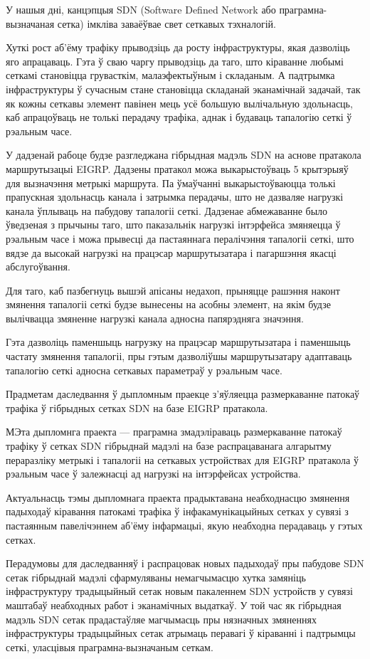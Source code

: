 \sectionWithoutNumber{\prefacename}

У нашыя дні, канцэпцыя SDN (Software Defined Network або праграмна-вызначаная сетка)
імкліва заваёўвае свет сеткавых тэхналогій.

Хуткі рост аб'ёму трафіку прыводзіць да росту інфраструктуры, якая
дазволіць яго апрацаваць. Гэта ў сваю чаргу прыводзіць да таго, што кіраванне
любымі сеткамі становіцца грувасткім, малаэфектыўным і складаным.
А падтрымка інфраструктуры ў сучасным стане становіцца складанай эканамічнай задачай,
так як кожны сеткавы элемент павінен мець усё большую вылічальную здольнасць, каб
апрацоўваць не толькі перадачу трафіка, аднак і будаваць тапалогію сеткі ў рэальным часе.

У дадзенай рабоце будзе разгледжана гібрыдная мадэль
SDN на аснове пратакола маршрутызацыі EIGRP.
Дадзены пратакол можа выкарыстоўваць 5 крытэрыяў для вызначэння метрыкі маршрута.
Па ўмаўчанні выкарыстоўваюцца толькі прапускная здольнасць канала і затрымка перадачы,
што не дазваляе нагрузкі канала ўплываць на пабудову тапалогіі сеткі.
Дадзенае абмежаванне было ўведзеная з прычыны таго, што паказальнік нагрузкі інтэрфейса
змяняецца ў рэальным часе і можа прывесці да пастаяннага пералічэння тапалогіі сеткі, што
вядзе да высокай нагрузкі на працэсар маршрутызатара і пагаршэння якасці абслугоўвання.

Для таго, каб пазбегнуць вышэй апісаны недахоп, прыняцце рашэння наконт змянення тапалогіі сеткі
будзе вынесены на асобны элемент, на якім будзе вылічвацца змяненне нагрузкі канала адносна
папярэдняга значэння.

Гэта дазволіць паменшыць нагрузку на працэсар маршрутызатара і паменшыць частату змянення
тапалогіі, пры гэтым дазволіўшы маршрутызатару адаптаваць тапалогію сеткі адносна сеткавых параметраў
у рэальным часе.

Прадметам даследвання ў дыпломным праекце з'яўляецца размеркаванне патокаў трафіка ў гібрыдных сетках SDN на базе EIGRP пратакола.

МЭта дыпломнга праекта --- праграмна змадэліраваць размеркаванне
патокаў трафіку ў сетках SDN гібрыднай мадэлі на базе распрацаванага алгарытму пераразліку метрыкі
і тапалогіі на сеткавых устройствах для EIGRP пратакола ў рэальным часе
ў залежнасці ад нагрузкі на інтэрфейсах устройства.

Актуальнасць тэмы дыпломнага праекта прадыктавана неабходнасцю
змянення падыходаў кіравання патокамі трафіка ў інфакамунікацыйных сетках
у сувязі з пастаянным павелічэннем аб'ёму інфармацыі, якую неабходна
перадаваць у гэтых сетках.

Перадумовы для даследванняў і распрацовак новых падыходаў пры пабудове
SDN сетак гібрыднай мадэлі сфармуляваны немагчымасцю хутка замяніць
інфраструктуру традыцыйный сетак новым пакаленнем SDN устройств у сувязі маштабаў неабходных
работ і эканамічных выдаткаў. У той час як гібрыдная мадэль SDN сетак
прадастаўляе магчымасць пры нязначных змяненнях інфраструктуры традыцыйных сетак атрымаць перавагі ў кіраванні і падтрымцы сеткі, уласцівыя праграмна-вызначаным сеткам.


\clearpage
